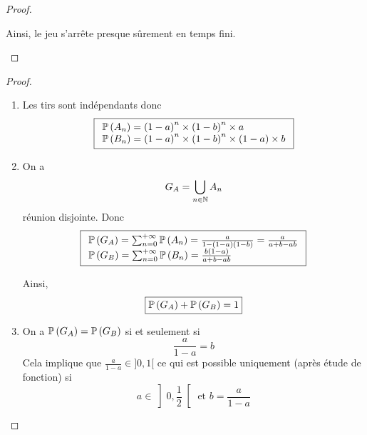 \documentclass[12pt]{article}
\begin{document}
\begin{proof}
\begin{enumerate}
        Ainsi, le jeu s'arrête presque sûrement en temps fini.
    \end{enumerate}
\end{proof}

\begin{proof}
    \phantom{}
    \begin{enumerate}
        \item Les tirs sont indépendants donc 
        \begin{equation}
            \boxed{
                \begin{array}[]{l}
                    \P\left(A_{n}\right)=\left(1-a\right)^{n}\times\left(1-b\right)^{n}\times a\\
                    \P\left(B_{n}\right)=\left(1-a\right)^{n}\times\left(1-b\right)^{n}\times \left(1-a\right)\times b
                \end{array}
            }    
        \end{equation}
        
        \item On a 
        \begin{equation}
            G_{A}=\bigcup_{n\in\N}A_{n}
        \end{equation}
        réunion disjointe. Donc 
        \begin{equation}
            \boxed{
                \begin{array}[]{l}
                    \P\left(G_{A}\right)=\sum_{n=0}^{+\infty}\P\left(A_{n}\right)=\frac{a}{1-\left(1-a\right)\left(1-b\right)}=\frac{a}{a+b-ab}\\
                    \P\left(G_{B}\right)=\sum_{n=0}^{+\infty}\P\left(B_{n}\right)=\frac{b\left(1-a\right)}{a+b-ab}\\
                \end{array}
            }
        \end{equation}
        
        Ainsi, 
        \begin{equation}
            \boxed{\P\left(G_{A}\right)+\P\left(G_{B}\right)=1}
        \end{equation}

        \item On a $\P\left(G_{A}\right)=\P\left(G_{B}\right)$ si et seulement si 
        \begin{equation}
            \frac{a}{1-a}=b
        \end{equation}
        Cela implique que $\frac{a}{1-a}\in]0,1[$ ce qui est possible uniquement (après étude de fonction) si
        \begin{equation}
            \boxed{a\in\left]0,\frac{1}{2}\right[\text{ et }b=\frac{a}{1-a}}
        \end{equation}
    \end{enumerate}
\end{proof}
\end{document}
